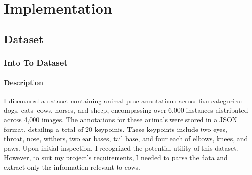 \chapter{Implementation}
\newcommand{\key}[1]{\textbf{#1}}
\section{Dataset}
\subsection{Into To Dataset}
\subsubsection{Description}
I discovered a dataset containing animal pose annotations across five categories: dogs, cats, cows, horses, and sheep, encompassing over 6,000 instances distributed across 4,000 images. The annotations for these animals were stored in a JSON format, detailing a total of 20 keypoints. These keypoints include two eyes, throat, nose, withers, two ear bases, tail base, and four each of elbows, knees, and paws. Upon initial inspection, I recognized the potential utility of this dataset. However, to suit my project's requirements, I needed to parse the data and extract only the information relevant to cows.
\newpage
